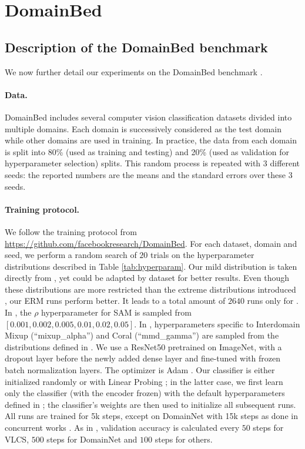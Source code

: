 \section{DomainBed}
\label{app:domainbeddetails}

\subsection{Description of the DomainBed benchmark}
\label{app:domainbed_description}

We now further detail our experiments on the DomainBed benchmark \cite{gulrajani2021in}.

\paragraph{Data.} DomainBed includes several computer vision classification datasets divided into multiple domains.
Each domain is successively considered as the test domain while other domains are used in training.
In practice, the data from each domain is split into 80\% (used as training and testing) and 20\% (used as validation for hyperparameter selection) splits. This random process is repeated with 3 different seeds: the reported numbers are the means and the standard errors over these 3 seeds.

\paragraph{Training protocol.}
We follow the training protocol from \url{https://github.com/facebookresearch/DomainBed}.
For each dataset, domain and seed, we perform a random search of $20$ trials on the hyperparameter distributions described in Table \ref{tab:hyperparam}.
Our mild distribution is taken directly from \cite{cha2021wad}, yet could be adapted by dataset for better results.
Even though these distributions are more restricted than the extreme distributions introduced \cite{gulrajani2021in}, our ERM runs perform better.
It leads to a total amount of $2640$ runs only for .
In , the $\rho$ hyperparameter for SAM is sampled from $[0.001, 0.002, 0.005, 0.01, 0.02, 0.05]$.
In , hyperparameters specific to Interdomain Mixup \cite{yan2020improve} (\enquote{mixup\_alpha}) and Coral \cite{coral216aaai} (\enquote{mmd\_gamma}) are sampled from the distributions defined in \cite{gulrajani2021in}.
We use a ResNet50 \cite{he51deep} pretrained on ImageNet, with a dropout layer before the newly added dense layer and fine-tuned with frozen batch normalization layers. The optimizer is Adam \cite{kingma2014adam}. Our classifier is either initialized randomly or with Linear Probing \cite{kumar2022finetuning}; in the latter case, we first learn only the classifier (with the encoder frozen) with the default hyperparameters defined in ; the classifier's weights are then used to initialize all subsequent runs.
All runs are trained for 5k steps, except on DomainNet with 15k steps as done in concurrent works \cite{cha2021wad,arpit2021ensemble}. As in \cite{cha2021wad}, validation accuracy is calculated every $50$ steps for VLCS, $500$ steps for DomainNet and $100$ steps for others.

